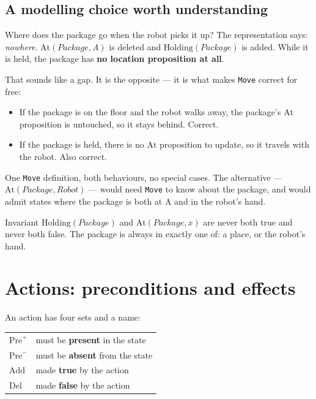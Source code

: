 \documentclass[11pt,a4paper]{article}
\begin{document}
\subsection{A modelling choice worth understanding}

Where does the package go when the robot picks it up? The representation says:
\emph{nowhere}. $\mathrm{At}(Package,A)$ is deleted and
$\mathrm{Holding}(Package)$ is added. While it is held, the package has
\textbf{no location proposition at all}.

That sounds like a gap. It is the opposite --- it is what makes \texttt{Move}
correct for free:

\begin{itemize}
  \item If the package is on the floor and the robot walks away, the package's
        $\mathrm{At}$ proposition is untouched, so it stays behind. Correct.
  \item If the package is held, there is no $\mathrm{At}$ proposition to
        update, so it travels with the robot. Also correct.
\end{itemize}

One \texttt{Move} definition, both behaviours, no special cases. The
alternative --- $\mathrm{At}(Package, Robot)$ --- would need \texttt{Move} to
know about the package, and would admit states where the package is both at A
and in the robot's hand.

\begin{okbox}{Invariant}
$\mathrm{Holding}(Package)$ and $\mathrm{At}(Package,x)$ are never both true and
never both false. The package is always in exactly one of: a place, or the
robot's hand.
\end{okbox}

\section{Actions: preconditions and effects}

An action has four sets and a name:

\begin{center}
\begin{tabular}{@{}ll@{}}
\toprule
$\mathrm{Pre}^{+}$ & must be \textbf{present} in the state \\
$\mathrm{Pre}^{-}$ & must be \textbf{absent} from the state \\
$\mathrm{Add}$     & made \textbf{true} by the action \\
$\mathrm{Del}$     & made \textbf{false} by the action \\
\bottomrule
\end{tabular}
\end{center}
\end{document}
